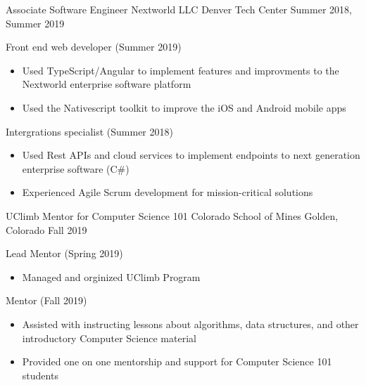 \vspace{-2.0mm}

\begin{cventries}

  \cventry
    {Associate Software Engineer} %
    {Nextworld LLC} %
    {Denver Tech Center} %
    {Summer 2018, Summer 2019} %
    {
      \begin{cvitems} %
      \item {Front end web developer (Summer 2019)}
      \begin{itemize}
            \item {Used TypeScript/Angular to implement features and
    improvments to the Nextworld enterprise software platform}
        \item {Used the Nativescript toolkit to improve the iOS and
    Android mobile apps}
    \end{itemize}
        \item {Intergrations specialist (Summer 2018)}
        \begin{itemize}
                \item {Used Rest APIs and cloud services to implement
                            endpoints to next generation enterprise software (C\#)}
                                    \item {Experienced Agile Scrum
    development for mission-critical solutions}
    \end{itemize}
      \end{cvitems}
    }

    \cventry
    	{UClimb Mentor for Computer Science 101}
    	{ Colorado School of Mines }
    	{ Golden, Colorado}
	   	 {Fall 2019  }
   	 {
   	 \begin{cvitems}
         \item {Lead Mentor (Spring 2019)}
         \begin{itemize}
         \item {Managed and orginized UClimb Program} %
         \end{itemize}
         \item {Mentor (Fall 2019)}
         \begin{itemize}
            	 \item {Assisted with instructing lessons about algorithms, data structures, and other introductory Computer Science material}
   	         \item {Provided one on one mentorship and support for
    	Computer Science 101 students}
        \end{itemize}
    \end{cvitems}
    }


\end{cventries}
